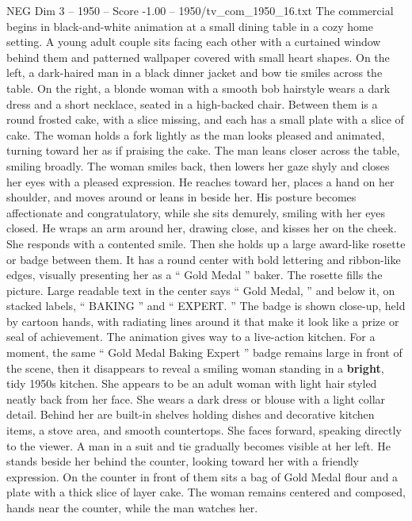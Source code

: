 \begin{textsample}{NEG Dim 3 – 1950 – Score -1.00 – 1950/tv\_com\_1950\_16.txt}  \label{ex:f3_neg_083}
The commercial begins in black-and-white animation at a small dining table in a cozy home setting.
A young adult couple sits facing each other with a curtained window behind them and patterned wallpaper covered with small heart shapes.
On the left, a dark-haired man in a black dinner jacket and bow tie smiles across the table.
On the right, a blonde woman with a smooth bob hairstyle wears a dark dress and a short necklace, seated in a high-backed chair.
Between them is a round frosted cake, with a slice missing, and each has a small plate with a slice of cake.
The woman holds a fork lightly as the man looks pleased and animated, turning toward her as if praising the cake.
The man leans closer across the table, smiling broadly.
The woman smiles back, then lowers her gaze shyly and closes her eyes with a pleased expression.
He reaches toward her, places a hand on her shoulder, and moves around or leans in beside her.
His posture becomes affectionate and congratulatory, while she sits demurely, smiling with her eyes closed.
He wraps an arm around her, drawing close, and kisses her on the cheek.
She responds with a contented smile.
Then she holds up a large award-like rosette or badge between them.
It has a round center with bold lettering and ribbon-like edges, visually presenting her as a “ Gold Medal ” baker.
The rosette fills the picture.
Large readable text in the center says “ Gold Medal, ” and below it, on stacked labels, “ BAKING ” and “ EXPERT. ” The badge is shown close-up, held by cartoon hands, with radiating lines around it that make it look like a prize or seal of achievement.
The animation gives way to a live-action kitchen.
For a moment, the same “ Gold Medal Baking Expert ” badge remains large in front of the scene, then it disappears to reveal a smiling woman standing in a \textbf{bright}, tidy 1950s kitchen.
She appears to be an adult woman with light hair styled neatly back from her face.
She wears a dark dress or blouse with a light collar detail.
Behind her are built-in shelves holding dishes and decorative kitchen items, a stove area, and smooth countertops.
She faces forward, speaking directly to the viewer.
A man in a suit and tie gradually becomes visible at her left.
He stands beside her behind the counter, looking toward her with a friendly expression.
On the counter in front of them sits a bag of Gold Medal flour and a plate with a thick slice of layer cake.
The woman remains centered and composed, hands near the counter, while the man watches her.

\end{textsample}
